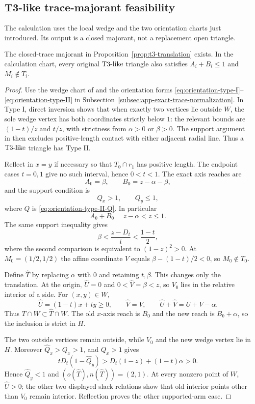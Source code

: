 \subsection{T3-like trace-majorant feasibility}

The calculation uses the local wedge and the two orientation charts just
introduced.  Its output is a closed majorant, not a replacement open triangle.

\begin{lemma}
\label{lem:app-t3-translation-calculation}
The closed-trace majorant in Proposition~\ref{prop:t3-translation} exists.
In the calculation chart, every original $\mathrm{T3\text{-}like}$ triangle also satisfies
$A_i+B_i\le1$ and $M_i\notin T_i$.
\end{lemma}

\begin{proof}
Use the wedge chart of  and the
orientation forms \eqref{eq:orientation-type-I}--
\eqref{eq:orientation-type-II} in
Subsection~\ref{subsec:app-exact-trace-normalization}.  In Type I,
direct inversion shows that when exactly two vertices lie outside $W$, the
sole wedge vertex has both coordinates strictly below $1$: the relevant
bounds are $(1-t)/z$ and $t/z$, with strictness from $\alpha>0$ or
$\beta>0$.  The support argument in
 then excludes positive-length contact
with either adjacent radial line.  Thus a $\mathrm{T3\text{-}like}$ triangle has Type II.

Reflect in $x=y$ if necessary so that $T_0\cap r_1$ has positive length.
The endpoint cases $t=0,1$ give no such interval, hence $0<t<1$.  The exact
axis reaches are
\[
 A_0=\beta,\qquad B_0=z-\alpha-\beta,
\]
and the support condition is
\[
 Q_x>1,\qquad Q_y\le1,
\]
where $Q$ is \eqref{eq:orientation-type-II-Q}.  In particular
\[
 A_0+B_0=z-\alpha<z\le1.
\]
The same support inequality gives
\[
 \beta<\frac{z-D_t}{t}<\frac{1-t}{2},
\]
where the second comparison is equivalent to $(1-z)^2>0$.
At $M_0=(1/2,1/2)$ the affine coordinate $V$ equals
$\beta-(1-t)/2<0$, so $M_0\notin T_0$.

Define $\widehat T$ by replacing $\alpha$ with $0$ and retaining $t,\beta$.
This changes only the translation.  At the origin,
$\widehat U=0$ and $0<\widehat V=\beta<z$, so $V_0$ lies in the relative
interior of a side.  For $(x,y)\in W$,
\[
 \widehat U=(1-t)x+ty\ge0,
 \qquad\widehat V=V,
 \qquad\widehat U+\widehat V=U+V-\alpha.
\]
Thus $T\cap W\subset\widehat T\cap W$.  The old $x$-axis reach is $B_0$ and
the new reach is $B_0+\alpha$, so the inclusion is strict in $H$.

The two outside vertices remain outside, while $V_0$ and the new wedge vertex
lie in $H$.  Moreover $\widehat Q_x>Q_x>1$, and $Q_x>1$ gives
\[
 tD_t(1-\widehat Q_y)
 >D_t(1-z)+(1-t)\alpha>0.
\]
Hence $\widehat Q_y<1$ and $(o(\widehat T),n(\widehat T))=(2,1)$.  At every
nonzero point of $W$, $\widehat U>0$; the other two displayed slack relations
show that old interior points other than $V_0$ remain interior.  Reflection
proves the other supported-arm case.
\end{proof}

